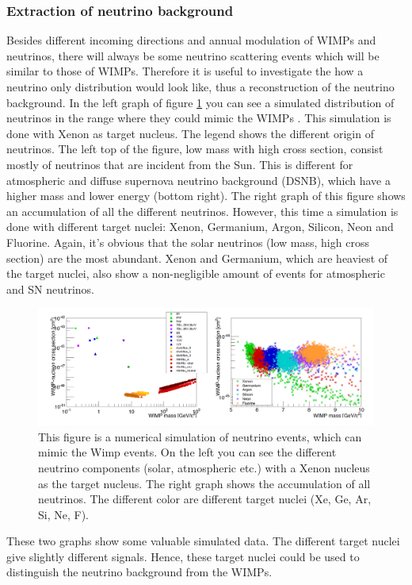 \documentclass{article}
\begin{document}
\FloatBarrier
\subsubsection{Extraction of neutrino background}
Besides different incoming directions and annual modulation of WIMPs and neutrinos, there will always be some neutrino scattering events which will be similar to those of WIMPs. Therefore it is useful to investigate the how a neutrino only distribution would look like, thus a reconstruction of the neutrino background. In the left graph of figure \ref{Neutrino Background} you can see a simulated distribution of neutrinos in the range where they could mimic the WIMPs \cite{Billard:2013qya}. This simulation is done with Xenon as target nucleus. The legend shows the different origin of neutrinos. The left top of the figure, low mass with high cross section, consist mostly of neutrinos that are incident from the Sun. This is different for atmospheric and diffuse supernova neutrino background (DSNB), which have a higher mass and lower energy (bottom right).
The right graph of this figure shows an accumulation of all the different neutrinos. However, this time a simulation is done with different target nuclei: Xenon, Germanium, Argon, Silicon, Neon and Fluorine. Again, it's obvious that the solar neutrinos (low mass, high cross section) are the most abundant. Xenon and Germanium, which are heaviest of the target nuclei, also show a non-negligible amount of events for atmospheric and SN neutrinos. 

\begin{figure}[h]
    \centering
    \includegraphics[width=\textwidth]{Neutrinos3.png}
    \caption{This figure is a numerical simulation of neutrino events, which can mimic the Wimp events. On the left you can see the different neutrino components (solar, atmospheric etc.) with a Xenon nucleus as the target nucleus. The right graph shows the accumulation of all neutrinos. The different color are different target nuclei (Xe, Ge, Ar, Si, Ne, F).  \cite{Billard:2013qya}}
    \label{Neutrino Background}
\end{figure}

These two graphs show some valuable simulated data. The different target nuclei give slightly different signals. Hence, these target nuclei could be used to distinguish the neutrino background from the WIMPs.







\FloatBarrier

\
\newpage


\end{document}
